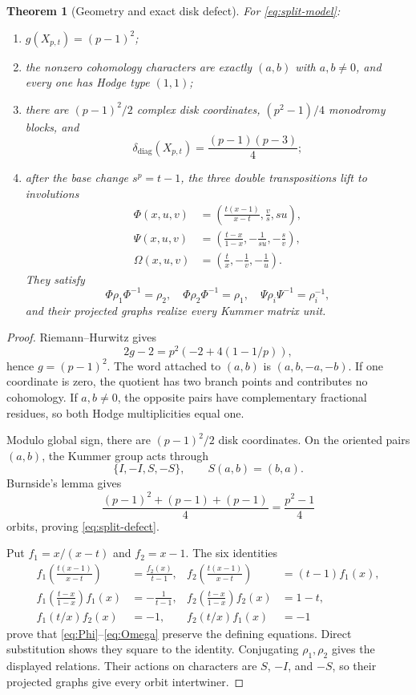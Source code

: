 \documentclass[11pt]{article}
\newtheorem{theorem}{Theorem}[section]
\theoremstyle{definition}
\theoremstyle{remark}
\newcommand{\diagdef}{\delta_{\mathrm{diag}}}
\begin{document}
\begin{theorem}[Geometry and exact disk defect]\label{thm:split-geometry}
For \eqref{eq:split-model}:
\begin{enumerate}
\item $g(X_{p,t})=(p-1)^2$;
\item the nonzero cohomology characters are exactly $(a,b)$ with $a,b\ne0$, and every one has Hodge type $(1,1)$;
\item there are $(p-1)^2/2$ complex disk coordinates, $(p^2-1)/4$ monodromy blocks, and
\begin{equation}\label{eq:split-defect}
 \diagdef(X_{p,t})=\frac{(p-1)(p-3)}4;
\end{equation}
\item after the base change $s^p=t-1$, the three double transpositions lift to involutions
\begin{align}
 \Phi(x,u,v)&=\left(\frac{t(x-1)}{x-t},\frac{v}{s},su\right),\label{eq:Phi}\\
 \Psi(x,u,v)&=\left(\frac{t-x}{1-x},-\frac1{su},-\frac{s}{v}\right),\label{eq:Psi}\\
 \Omega(x,u,v)&=\left(\frac{t}{x},-\frac1v,-\frac1u\right).\label{eq:Omega}
\end{align}
They satisfy
\[
 \Phi\rho_1\Phi^{-1}=\rho_2,
 \quad
 \Phi\rho_2\Phi^{-1}=\rho_1,
 \quad
 \Psi\rho_i\Psi^{-1}=\rho_i^{-1},
\]
and their projected graphs realize every Kummer matrix unit.
\end{enumerate}
\end{theorem}

\begin{proof}
Riemann--Hurwitz gives
\[
 2g-2=p^2\left(-2+4(1-1/p)\right),
\]
hence $g=(p-1)^2$.  The word attached to $(a,b)$ is
$(a,b,-a,-b)$.  If one coordinate is zero, the quotient has two branch points and contributes no cohomology.  If $a,b\ne0$, the opposite pairs have complementary fractional residues, so both Hodge multiplicities equal one.

Modulo global sign, there are $(p-1)^2/2$ disk coordinates.  On the oriented pairs $(a,b)$, the Kummer group acts through
\[
 \{I,-I,S,-S\},\qquad S(a,b)=(b,a).
\]
Burnside's lemma gives
\[
 \frac{(p-1)^2+(p-1)+(p-1)}4=\frac{p^2-1}{4}
\]
orbits, proving \eqref{eq:split-defect}.

Put $f_1=x/(x-t)$ and $f_2=x-1$.  The six identities
\begin{align*}
 f_1\!\left(\frac{t(x-1)}{x-t}\right)&=\frac{f_2(x)}{t-1},&
 f_2\!\left(\frac{t(x-1)}{x-t}\right)&=(t-1)f_1(x),\\
 f_1\!\left(\frac{t-x}{1-x}\right)f_1(x)&=-\frac1{t-1},&
 f_2\!\left(\frac{t-x}{1-x}\right)f_2(x)&=1-t,\\
 f_1(t/x)f_2(x)&=-1,&
 f_2(t/x)f_1(x)&=-1
\end{align*}
prove that \eqref{eq:Phi}--\eqref{eq:Omega} preserve the defining equations.  Direct substitution shows they square to the identity.  Conjugating $\rho_1,\rho_2$ gives the displayed relations.  Their actions on characters are $S$, $-I$, and $-S$, so their projected graphs give every orbit intertwiner.
\end{proof}
\end{document}
